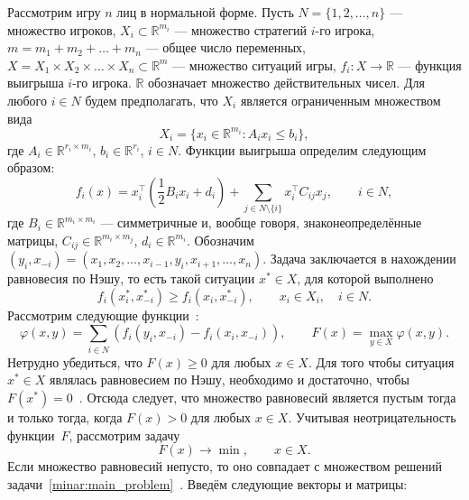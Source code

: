 Рассмотрим игру $n$ лиц в нормальной форме. Пусть $N=\{ 1,2,\dots, n\}$ --- множество игроков, $X_i\subset \mathbb{R}^{m_i}$ --- множество стратегий $i$-го игрока, $m=m_1+m_2+\dots+m_n$ --- общее число переменных, $X=X_1\times X_2 \times \dots \times X_n\subset\mathbb{R}^m$ --- множество ситуаций игры, $f_i\colon X\rightarrow \mathbb{R}$ --- функция выигрыша $i$-го игрока. $\mathbb{R}$ обозначает множество действительных чисел. Для любого $i\in N$ будем предполагать, что $X_i$ является ограниченным множеством вида
\begin{equation*}
	\label{minar:X}
	X_i = \{ x_i\in \mathbb{R}^{m_i} \colon A_i x_i \leq b_i \},
\end{equation*}
где $A_i\in \mathbb{R}^{r_i\times m_i}$, $b_i\in \mathbb{R}^{r_i}$, $i\in N$. Функции выигрыша определим следующим образом:
\begin{equation*}
	\label{minar:f}
	f_i(x) = x_i^\top \left( \frac{1}{2}B_i x_i + d_i \right) + \sum_{j\in N\setminus\{i\}} x_i^\top C_{ij} x_j, \qquad i\in N,
\end{equation*}
где $B_i\in \mathbb{R}^{m_i\times m_i}$ --- симметричные и, вообще говоря, знаконеопределённые матрицы, $C_{ij} \in \mathbb{R}^{m_i\times m_j}$, $d_i\in \mathbb{R}^{m_i}$. Обозначим $(y_i,x_{-i}) = (x_1,x_2,\dots,x_{i-1},y_i,x_{i+1}, \dots, x_n)$. Задача заключается в нахождении равновесия по Нэшу, то есть такой ситуации $x^\ast\in X$, для которой выполнено
\begin{equation*}
	f_i(x_i^\ast, x_{-i}^\ast) \geq f_i(x_i, x_{-i}^\ast), \qquad x_i\in X_i, \quad i\in N.
\end{equation*}
Рассмотрим следующие функции~\cite{NikaidoIsoda1955}:
\begin{equation*}
	\varphi(x,y) = \sum_{i\in N} \left( f_i(y_i,x_{-i}) - f_i(x_i,x_{-i}) \right),\qquad
	F(x) = \max_{y\in X} \varphi(x,y).
\end{equation*}
Нетрудно убедиться, что $F(x)\geq 0$ для любых $x\in X$. Для того чтобы ситуация $x^\ast\in X$ являлась равновесием по Нэшу, необходимо и достаточно, чтобы $F(x^\ast) = 0$~\cite{NikaidoIsoda1955}. Отсюда следует, что множество равновесий является пустым тогда и только тогда, когда $F(x)>0$ для любых $x\in X$. Учитывая неотрицательность функции~$F$, рассмотрим задачу
\begin{equation}
	\label{minar:main_problem}
	F(x)\rightarrow\min, \qquad x\in X.
\end{equation}
Если множество равновесий непусто, то оно совпадает с множеством решений задачи~\eqref{minar:main_problem}~\cite{Khamisov2003}. Введём следующие векторы и матрицы:
